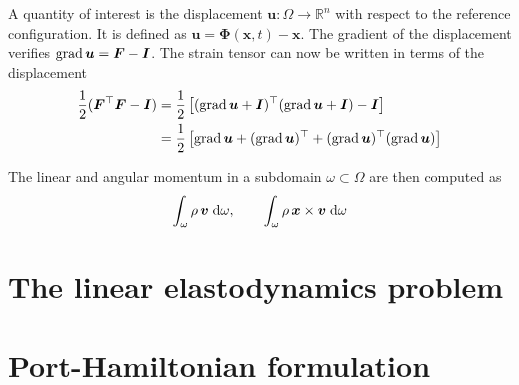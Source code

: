 A quantity of interest is the displacement $\bm{u}: \Omega \rightarrow \mathbb{R}^n$ with respect to the reference configuration. It is defined as $\bm{u} = \bm{\Phi}(\bm{x}, t) - \bm{x}$. The gradient of the displacement verifies $\operatorname*{grad}\bm{u} = \bm{F} - \bm{I}$. The strain tensor can now be written in terms of the displacement
\begin{align*}
	\frac{1}{2} (\bm{F}^\top \bm{F} - \bm{I}) &= \frac{1}{2}\left[(\operatorname*{grad} \bm{u} + \bm{I})^\top (\operatorname*{grad} \bm{u} + \bm{I}) - \bm{I}\right] \\
	&= \frac{1}{2}\left[\operatorname*{grad} \bm{u} + (\operatorname*{grad} \bm{u})^\top + (\operatorname*{grad} \bm{u})^\top (\operatorname*{grad} \bm{u})\right]
\end{align*}

The linear and angular momentum in a subdomain $\omega \subset \Omega$ are then computed as 
\[
\int_{\omega} \rho \, \bm{v} \d{\omega}, \qquad \int_{\omega} \rho \, \bm{x} \times \bm{v} \d{\omega}
\]

\section{The linear elastodynamics problem}


\section{Port-Hamiltonian formulation}



